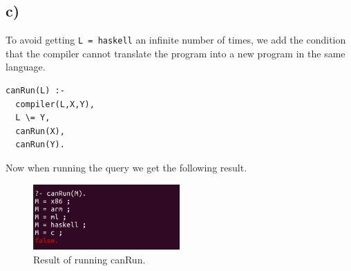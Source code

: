 \subsection*{c)}
To avoid getting \texttt{L = haskell} an infinite number of times, we add the condition that the compiler cannot translate the program into a new program in the same language. 

\begin{verbatim}
canRun(L) :-
  compiler(L,X,Y),
  L \= Y,
  canRun(X),
  canRun(Y).
\end{verbatim}

Now when running the query we get the following result.
\begin{figure}[h]
\centering
\includegraphics[width=0.5\textwidth]{a31c.png}
\caption{Result of running canRun.}
\end{figure}

